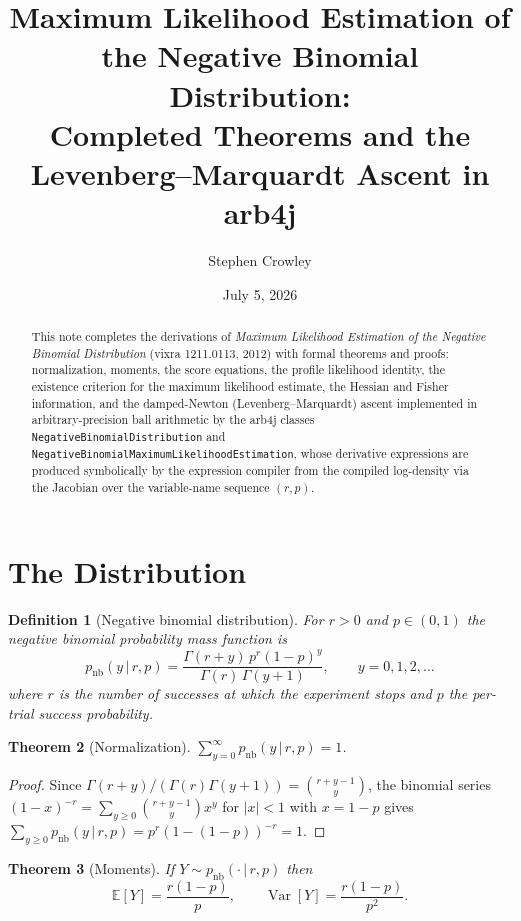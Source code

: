 \documentclass[11pt]{article}
\title{Maximum Likelihood Estimation of the Negative Binomial Distribution:\\
Completed Theorems and the Levenberg--Marquardt Ascent in arb4j}
\author{Stephen Crowley}
\date{July 5, 2026}
\newtheorem{theorem}{Theorem}[section]
\newtheorem{definition}[theorem]{Definition}
\begin{document}
\maketitle

\begin{abstract}
This note completes the derivations of \emph{Maximum Likelihood Estimation of
the Negative Binomial Distribution} (vixra 1211.0113, 2012) with formal
theorems and proofs: normalization, moments, the score equations, the profile
likelihood identity, the existence criterion for the maximum likelihood
estimate, the Hessian and Fisher information, and the damped-Newton
(Levenberg--Marquardt) ascent implemented in arbitrary-precision ball
arithmetic by the arb4j classes
\texttt{NegativeBinomialDistribution} and
\texttt{NegativeBinomialMaximumLikelihoodEstimation}, whose derivative
expressions are produced symbolically by the expression compiler from the
compiled log-density via the Jacobian over the variable-name sequence
$(r,p)$.
\end{abstract}

\section{The Distribution}

\begin{definition}[Negative binomial distribution]\label{def:nb}
For $r>0$ and $p\in(0,1)$ the negative binomial probability mass function is
\begin{equation}
p_{\mathrm{nb}}(y\,|\,r,p)=\frac{\Gamma(r+y)\,p^{r}(1-p)^{y}}{\Gamma(r)\,\Gamma(y+1)},
\qquad y=0,1,2,\ldots
\label{eq:pmf}
\end{equation}
where $r$ is the number of successes at which the experiment stops and $p$
the per-trial success probability.
\end{definition}

\begin{theorem}[Normalization]\label{thm:norm}
$\displaystyle\sum_{y=0}^{\infty}p_{\mathrm{nb}}(y\,|\,r,p)=1$.
\end{theorem}

\begin{proof}
Since $\Gamma(r+y)/(\Gamma(r)\Gamma(y+1))=\binom{r+y-1}{y}$, the binomial
series $(1-x)^{-r}=\sum_{y\ge0}\binom{r+y-1}{y}x^{y}$ for $|x|<1$ with
$x=1-p$ gives
$\sum_{y\ge0}p_{\mathrm{nb}}(y\,|\,r,p)=p^{r}(1-(1-p))^{-r}=1$.
\end{proof}

\begin{theorem}[Moments]\label{thm:moments}
If $Y\sim p_{\mathrm{nb}}(\cdot\,|\,r,p)$ then
\begin{equation}
\mathbb{E}[Y]=\frac{r(1-p)}{p},
\qquad
\operatorname{Var}[Y]=\frac{r(1-p)}{p^{2}} .
\label{eq:moments}
\end{equation}
\end{theorem}
\end{document}
